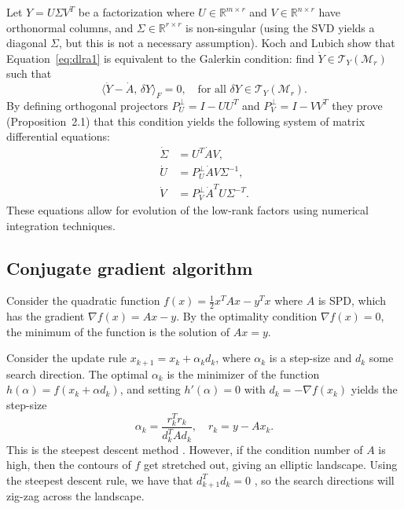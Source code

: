 Let $Y = U \Sigma V^T$ be a factorization where $U \in \mathbb{R}^{m \times r}$ and $V \in \mathbb{R}^{n \times r}$ have orthonormal columns, and $\Sigma \in \mathbb{R}^{r \times r}$ is non-singular (using the SVD yields a diagonal $\Sigma$, but this is not a necessary assumption). Koch and Lubich show that Equation~\eqref{eq:dlra1} is equivalent to the Galerkin condition: find $\dot{Y} \in \mathcal{T}_{Y}(\mathcal{M}_r)$ such that
\begin{equation*}
    \langle \dot{Y} - \dot{A},\, \delta Y \rangle_F = 0,\quad \text{for all } \delta Y \in \mathcal{T}_{Y}(\mathcal{M}_r).
\end{equation*}
By defining orthogonal projectors $P_U^{\perp} = I - U U^T$ and $P_V^{\perp} = I - V V^T$ they prove (Proposition~2.1) that this condition yields the following system of matrix differential equations:
\begin{equation*}
    \begin{aligned}
    \dot{\Sigma} &= U^T \dot{A} V, \\
    \dot{U} &= P_U^{\perp} \dot{A} V \Sigma^{-1}, \\
    \dot{V} &= P_V^{\perp} \dot{A}^T U \Sigma^{-T}.
    \end{aligned}
\end{equation*}
These equations allow for evolution of the low-rank factors using numerical integration techniques.


\subsection{Conjugate gradient algorithm}\label{appendix:conjugate_gradient_algorithm}
Consider the quadratic function $f(x) = \tfrac 1 2 x^T A x - y^T x$ where $A$ is SPD, which has the gradient $\nabla f(x) = A x - y$. By the optimality condition $\nabla f(x) = 0$, the minimum of the function is the solution of $A x = y$.

Consider the update rule $x_{k+1} = x_k + \alpha_k d_k$, where $\alpha_k$ is a step-size and $d_k$ some search direction. The optimal $\alpha_k$ is the minimizer of the function $h(\alpha) = f(x_{k} + \alpha d_k)$, and setting $h'(\alpha) = 0$ with $d_k = -\nabla f(x_k)$ yields the step-size
\begin{equation*}
    \alpha_k = \frac{r_k^Tr_k}{d_k^TAd_k}, \quad r_k = y - Ax_k.
\end{equation*}
This is the steepest descent method \cite{chong2023introduction}. However, if the condition number of $A$ is high, then the contours of $f$ get stretched out, giving an elliptic landscape. Using the steepest descent rule, we have that $d_{k+1}^T d_k = 0$ \cite{chong2023introduction}, so the search directions will zig-zag across the landscape.

